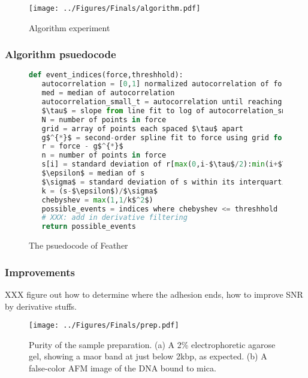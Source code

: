\documentclass[%
  aip,12pt,tightenlines,
  amsthm,
 amsmath,amssymb
]{article}
\newcommand{\fLabel}[1]{\label{figure:#1}}
\newcommand{\pEndF}[0]{ \\ }
\newcommand{\pStartF}[0]{ }
\newcommand{\name}[0]{Feather}
\newcommand{\figwidth}[0]{\linewidth}
\begin{document}
\begin{figure}
\centering
\texttt{[image: ../Figures/Finals/algorithm.pdf]}%
\caption[\name{} algorithmic pipeline]{\noindent\fLabel{FeatherExample}\pStartF Algorithm experiment \pEndF }
\end{figure}


\subsubsection{Algorithm psuedocode}

\begin{figure}
  \begin{lstlisting}[language=Python]
def event_indices(force,threshhold):
   autocorrelation = [0,1] normalized autocorrelation of force
   med = median of autocorrelation
   autocorrelation_small_t = autocorrelation until reaching med
   $\tau$ = slope from line fit to log of autocorrelation_small_t
   N = number of points in force
   grid = array of points each spaced $\tau$ apart
   g$^{*}$ = second-order spline fit to force using grid for knots
   r = force - g$^{*}$
   n = number of points in force
   s[i] = standard deviation of r[max(0,i-$\tau$/2):min(i+$\tau$/2,n)]
   $\epsilon$ = median of s
   $\sigma$ = standard deviation of s within its interquartile region
   k = (s-$\epsilon$)/$\sigma$
   chebyshev = max(1,1/k$^2$)
   possible_events = indices where chebyshev <= threshhold
   # XXX: add in derivative filtering
   return possible_events
\end{lstlisting}
\caption[\name{} psuedocode]{\noindent\fLabel{Code}\pStartF The psuedocode of \name{}  \pEndF }
\end{figure}


\subsubsection{Improvements}

XXX figure out how to determine where the adhesion ends, how to improve SNR by derivative stuffs.


\begin{figure}
\centering
\texttt{[image: ../Figures/Finals/prep.pdf]}%
\caption[Verification of sample purity]{\noindent\fLabel{Prep}\pStartF Purity of the sample preparation. (a) A 2\% electrophoretic agarose gel, showing a maor band at just below 2kbp, as expected. (b) A false-color AFM image of the DNA bound to mica. \pEndF }
\end{figure}
\end{document}
